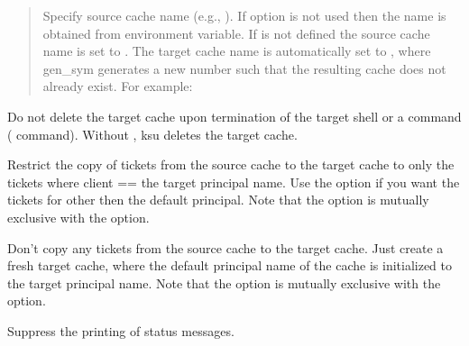 \documentclass[letterpaper,10pt,english]{sphinxmanual}
\begin{document}
\sphinxAtStartPar
{} 
\begin{quote}

\sphinxAtStartPar
Specify source cache name (e.g., ).  If
 option is not used then the name is obtained from
 environment variable.  If  is not
defined the source cache name is set to .
The target cache name is automatically set to , where gen\_sym generates a new number such that
the resulting cache does not already exist.  For example:

\begin{sphinxVerbatim}[commandchars=\\\{\}]
\end{sphinxVerbatim}
\end{quote}
\begin{description}
\sphinxAtStartPar
Do not delete the target cache upon termination of the target
shell or a command ( command).  Without , ksu deletes
the target cache.

\sphinxAtStartPar
Restrict the copy of tickets from the source cache to the target
cache to only the tickets where client == the target principal
name.  Use the  option if you want the tickets for other then
the default principal.  Note that the  option is mutually
exclusive with the  option.

\sphinxAtStartPar
Don’t copy any tickets from the source cache to the target cache.
Just create a fresh target cache, where the default principal name
of the cache is initialized to the target principal name.  Note
that the  option is mutually exclusive with the 
option.

\sphinxAtStartPar
Suppress the printing of status messages.

\end{description}
\end{document}
